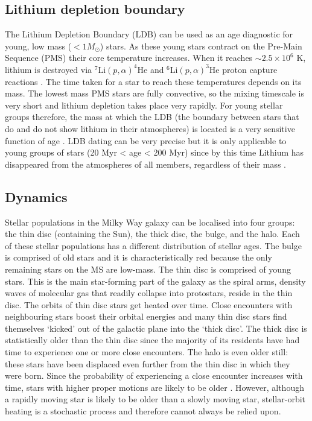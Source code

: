 \subsection{Lithium depletion boundary}
The Lithium Depletion Boundary (LDB) can be used as an age diagnostic for
young, low mass ($<1M_\odot$) stars.
As these young stars contract on the Pre-Main Sequence (PMS) their core
temperature increases.
When it reaches $\sim2.5\times10^6$ K, lithium is destroyed via $^7$Li$(p,
\alpha)^4$He and $^6$Li$(p, \alpha)^3$He proton capture reactions
\citep[\eg][]{Bodenheimer1965}.
The time taken for a star to reach these temperatures depends on its mass.
The lowest mass PMS stars are fully convective, so the mixing timescale is
very short and lithium depletion takes place very rapidly.
For young stellar groups therefore, the mass at which the LDB (the boundary
between stars that do and do not show lithium in their atmospheres) is located
is a very sensitive function of age \citep{Basri1996}.
LDB dating can be very precise but it is only applicable to young groups of
stars (20 Myr < age < 200 Myr) since by this time Lithium has disappeared from
the atmospheres of all members, regardless of their mass \citep{Burke2004}.

\subsection{Dynamics}
Stellar populations in the Milky Way galaxy can be localised into four groups:
the thin disc (containing the Sun), the thick disc, the bulge, and the halo.
Each of these stellar populations has a different distribution of stellar
ages.
The bulge is comprised of old stars and it is characteristically red because
the only remaining stars on the MS are low-mass.
The thin disc is comprised of young stars.
This is the main star-forming part of the galaxy as the spiral arms, density
waves of molecular gas that readily collapse into protostars, reside in the
thin disc.
The orbits of thin disc stars get heated over time.
Close encounters with neighbouring stars boost their orbital energies and many
thin disc stars find themselves `kicked' out of the galactic plane into the
`thick disc'.
The thick disc is statistically older than the thin disc since the majority of
its residents have had time to experience one or more close encounters.
The halo is even older still: these stars have been displaced even further
from the thin disc in which they were born.
Since the probability of experiencing a close encounter increases with time,
stars with higher proper motions are likely to be older \citep[see,
\eg][]{Shevelev1989, Nissen1991}.
However, although a rapidly moving star is likely to be older than a slowly
moving star, stellar-orbit heating is a stochastic process and therefore
cannot always be relied upon.

